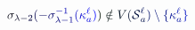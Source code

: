 \documentclass[12pt]{article}
\begin{document}
\makeatletter
\renewcommand*{\@textcolor}[3]{%
  \protect\leavevmode
  \begingroup
    \color#1{#2}#3%
  \endgroup
}
\makeatother
\begin{displaymath}
\mathcolor[RGB]{0,0,15}{\sigma} _ { \mathcolor[RGB]{0,0,30}{\lambda} \mathcolor[RGB]{0,0,45}{-} \mathcolor[RGB]{0,0,60}{2} } \mathcolor[RGB]{0,0,75}{(} \mathcolor[RGB]{0,0,90}{-} \mathcolor[RGB]{0,0,105}{\sigma} _ { \mathcolor[RGB]{0,0,120}{\lambda} \mathcolor[RGB]{0,0,135}{-} \mathcolor[RGB]{0,0,150}{1} } ^ { \mathcolor[RGB]{0,0,165}{-} \mathcolor[RGB]{0,0,180}{1} } \mathcolor[RGB]{0,0,195}{(} \mathcolor[RGB]{0,0,210}{\kappa} _ { \mathcolor[RGB]{0,0,225}{a} } ^ { \mathcolor[RGB]{0,0,240}{\ell} } \mathcolor[RGB]{0,0,255}{)} \mathcolor[RGB]{0,15,0}{)} \mathcolor[RGB]{0,15,15}{\notin} \mathcolor[RGB]{0,15,30}{V} \mathcolor[RGB]{0,15,45}{(} \mathcal { \mathcolor[RGB]{0,15,60}{S} } _ { \mathcolor[RGB]{0,15,75}{a} } ^ { \mathcolor[RGB]{0,15,90}{\ell} } \mathcolor[RGB]{0,15,105}{)} \mathcolor[RGB]{0,15,120}{\setminus} \mathcolor[RGB]{0,15,135}{\{} \mathcolor[RGB]{0,15,150}{\kappa} _ { \mathcolor[RGB]{0,15,165}{a} } ^ { \mathcolor[RGB]{0,15,180}{\ell} } \mathcolor[RGB]{0,15,195}{\}}
\end{displaymath}
\end{document}

